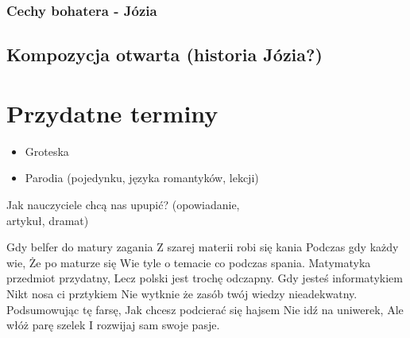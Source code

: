 \documentclass[a4paper]{article}
\begin{document}
\subsubsection{Cechy bohatera - Józia}
\subsection{Kompozycja otwarta (historia Józia?)}
\section{Przydatne terminy}
\begin{itemize}
    \item Groteska
    \item Parodia (pojedynku, języka romantyków, lekcji)
\end{itemize}
 Jak nauczyciele chcą nas upupić? (opowiadanie,\\ artykuł, dramat)

Gdy belfer do matury zagania
Z szarej materii robi się kania
Podczas gdy każdy wie,
Że po maturze się
Wie tyle o temacie co podczas spania.
Matymatyka przedmiot przydatny,
Lecz polski jest trochę odczapny.
Gdy jesteś informatykiem
Nikt nosa ci prztykiem
Nie wytknie że zasób twój wiedzy nieadekwatny.
Podsumowując tę farsę,
Jak chcesz podcierać się hajsem
Nie idź na uniwerek,
Ale włóż parę szelek
I rozwijaj sam swoje pasje.
\end{document}
